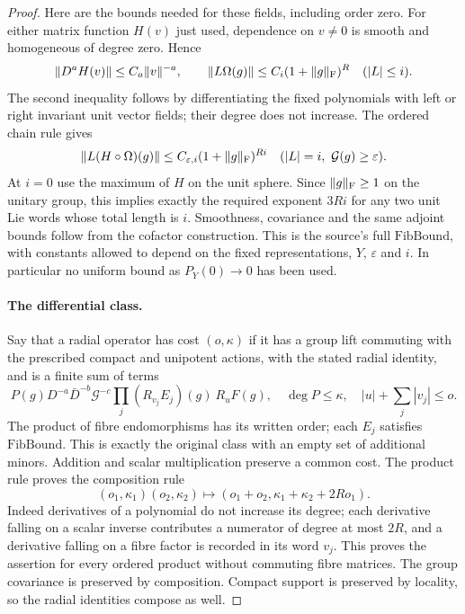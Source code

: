 \begin{proof}
Here are the bounds needed for these fields, including order
zero.  For either matrix function $H(v)$ just used, dependence
on $v\ne0$ is smooth and homogeneous of degree zero.  Hence
\[
 \|D^aH(v)\|\le C_a\|v\|^{-a},\qquad
 \|L\Omega(g)\|\le C_i(1+\|g\|_{\rm F})^R
                       \quad(|L|\le i).
\]
The second inequality follows by differentiating the fixed
polynomials with left or right invariant unit vector fields;
their degree does not increase.  The ordered chain rule gives
\[
 \|L(H\circ\Omega)(g)\|
   \le C_{\varepsilon,i}(1+\|g\|_{\rm F})^{Ri}
                \quad(|L|=i,\ \mathcal G(g)\ge\varepsilon).
\]
At $i=0$ use the maximum of $H$ on the unit sphere.  Since
$\|g\|_{\rm F}\ge1$ on the unitary group, this implies exactly
the required exponent $3Ri$ for any two unit Lie words whose
total length is $i$.  Smoothness, covariance and the same
adjoint bounds follow from the cofactor construction.  This
is the source's full $\mathrm{FibBound}$, with constants allowed
to depend on the fixed representations, $Y$, $\varepsilon$
and $i$.  In particular no uniform bound as $P_Y(0)\to0$
has been used.\cite{top-lift-fibre-source}

\paragraph{The differential class.}
Say that a radial operator has cost $(o,\kappa)$ if it has a
group lift commuting with the prescribed compact and unipotent
actions, with the stated radial identity, and is a finite sum
of terms
\begin{equation}\label{actual-top-lift-class}
 P(g)D^{-a}\bar D^{-b}\mathcal G^{-c}
       \prod_j(R_{v_j}E_j)(g)\ R_uF(g),
 \quad \deg P\le\kappa,\quad |u|+\sum_j|v_j|\le o.
\end{equation}
The product of fibre endomorphisms has its written order;
each $E_j$ satisfies $\mathrm{FibBound}$.  This is exactly
the original class with an empty set of additional minors.
Addition and scalar multiplication preserve a common cost.
The product rule proves the composition rule
\begin{equation}\label{actual-top-lift-compose}
 (o_1,\kappa_1)(o_2,\kappa_2)
  \longmapsto(o_1+o_2,\kappa_1+\kappa_2+2Ro_1).
\end{equation}
Indeed derivatives of a polynomial do not increase its degree;
each derivative falling on a scalar inverse contributes a
numerator of degree at most $2R$, and a derivative falling on
a fibre factor is recorded in its word $v_j$.  This proves
the assertion for every ordered product without commuting
fibre matrices.  The group covariance is preserved by
composition.  Compact support is preserved by locality, so
the radial identities compose as well.


\end{proof}
